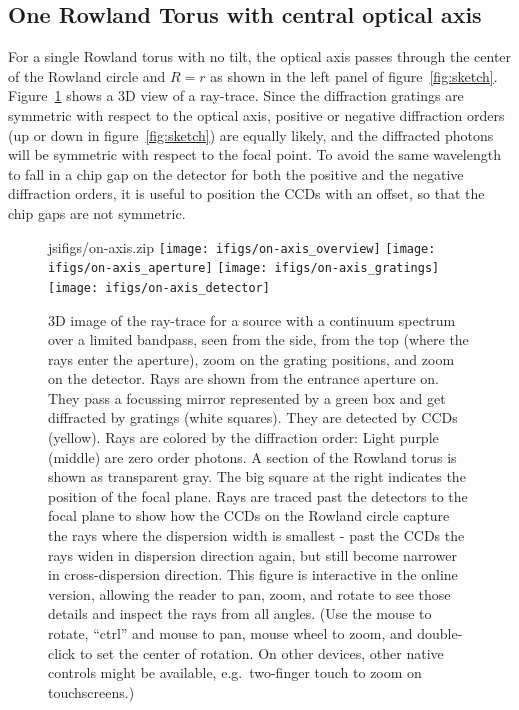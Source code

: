 \documentclass[linenumbers]{aastex631}
\begin{document}
\subsection{One Rowland Torus with central optical axis}
\label{sect:onetorus}
For a single Rowland torus with no tilt, the optical axis passes through the center of the Rowland circle and $R=r$ as shown in the left panel of figure~\ref{fig:sketch}. Figure~\ref{fig:3d:single} shows a 3D view of a ray-trace. Since the diffraction gratings are symmetric with respect to the optical axis, positive or negative diffraction orders (up or down in figure~\ref{fig:sketch}) are equally likely, and the diffracted photons will be symmetric with respect to the focal point. To avoid the same wavelength to fall in a chip gap on the detector for both the positive and the negative diffraction orders, it is useful to position the CCDs with an offset, so that the chip gaps are not symmetric.
\begin{figure}
  \begin{interactive}{js}{ifigs/on-axis.zip}
  \texttt{[image: ifigs/on-axis\_overview]}
  \texttt{[image: ifigs/on-axis\_aperture]}
  \texttt{[image: ifigs/on-axis\_gratings]}
  \texttt{[image: ifigs/on-axis\_detector]}
  \end{interactive}
\caption{3D image of the ray-trace for a source with a continuum spectrum over a limited bandpass, seen from the side, from the top (where the rays enter the aperture), zoom on the grating positions, and zoom on the detector. Rays are shown from the entrance aperture on. They pass a focussing mirror represented by a green box and get diffracted by gratings (white squares). They are detected by CCDs (yellow). Rays are colored by the diffraction order: Light purple (middle) are zero order photons. A section of the Rowland torus is shown as transparent gray. The big square at the right indicates the position of the focal plane. Rays are traced past the detectors to the focal plane to show how the CCDs on the Rowland circle capture the rays where the dispersion width is smallest - past the CCDs the rays widen in dispersion direction again, but still become narrower in cross-dispersion direction. This figure is interactive in the online version, allowing the reader to pan, zoom, and rotate to see those details and inspect the rays from all angles. (Use the mouse to rotate, ``ctrl'' and mouse to pan, mouse wheel to zoom, and double-click to set the center of rotation. On other devices, other native controls might be available, e.g.\ two-finger touch to zoom on touchscreens.)
\label{fig:3d:single}}

\end{figure}
\end{document}
